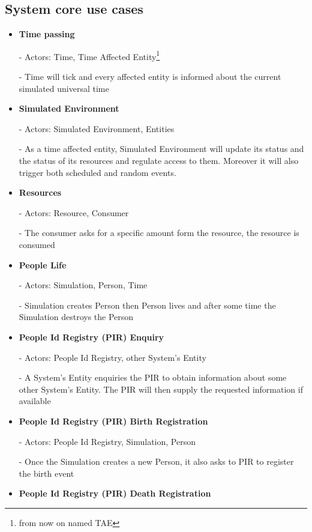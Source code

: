 \subsection{System core use cases}
\begin{itemize}
  \item \textbf{Time passing}  
	
	- Actors: Time, Time Affected Entity\footnote{from now on named TAE}

	- Time will tick and every affected entity is informed about the current simulated universal time

  \item \textbf{Simulated Environment}

	- Actors: Simulated Environment, Entities

	- As a time affected entity, Simulated Environment will update its status and the status of its resources and regulate access to them. Moreover it will also trigger both scheduled and random events.

  \item \textbf{Resources}

	- Actors: Resource, Consumer

	- The consumer asks for a specific amount form the resource, the resource is consumed

  \item \textbf{People Life} 

	- Actors: Simulation, Person, Time

	- Simulation creates Person then Person lives and after some time the Simulation destroys the Person

  \item \textbf{People Id Registry (PIR) Enquiry}

	- Actors: People Id Registry, other System's Entity

	- A System's Entity enquiries the PIR to obtain information about some other System's Entity. The PIR will then supply the requested information  if available

  \item \textbf{People Id Registry (PIR) Birth Registration}

	- Actors: People Id Registry, Simulation, Person

	- Once the Simulation creates a new Person, it also asks to PIR to register the birth event

  \item \textbf{People Id Registry (PIR) Death Registration}


\end{itemize}
